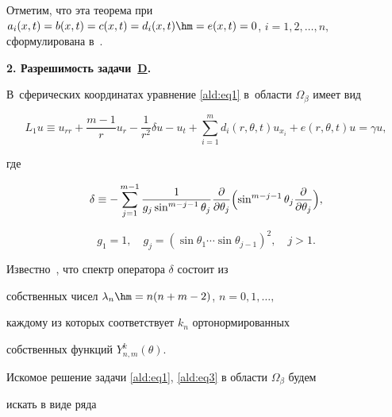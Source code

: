 \bigskip \rm



Отметим, что эта теорема при $a_i(x,t)= b(x,t)= c(x,t) = d_i(x,t)\hm= e(x,t)

=0$, $i=1,2, \dots,n,$  сформулирована в~\cite{aldash:5}.



\bigskip



\hypertarget{ald:p2}{}



\textbf{2. Разрешимость задачи~\hyperlink{ald:taskD}{D}.} 

В~сферических координатах уравнение \eqref{ald:eq1} в~области $\Omega_\beta$ имеет вид

\begin{equation}

L_1 u\equiv u_{rr}+\dfrac{m-1}{r}u_r - \dfrac{1}{r^2}\delta u -

u_t + \sum\limits_{i=1}^m d_i(r,\theta,t)u_{x_i}+ e(r,\theta,t)u =

\gamma u, 

\label{ald:eq4}

\end{equation}

где

$$

\delta \equiv -\sum\limits_{j=1}^{m-1} \dfrac{1}{g_j \sin^{m-j-1}\theta_j}\dfrac{\partial}{\partial

\theta_j}

\Bigl(\sin^{m-j-1}\theta_j\dfrac{\partial}{\partial \theta_j}\Bigr),

$$

$$

g_1=1,\quad 

g_j=(\sin\theta_1 \cdots \sin\theta_{j-1})^2,\quad  j>1.

$$



Известно~\cite{aldash:6}, что спектр оператора $\delta$ состоит из

собственных чисел $\lambda_n \hm = n (n+m -2)$, $n=0,1,\dots,$

каждому из которых соответствует $k_n$ ортонормированных

собственных функций $Y_{n,m}^k (\theta).$



Искомое решение задачи \eqref{ald:eq1}, \eqref{ald:eq3} в области $\Omega_\beta$ будем

искать в виде ряда

